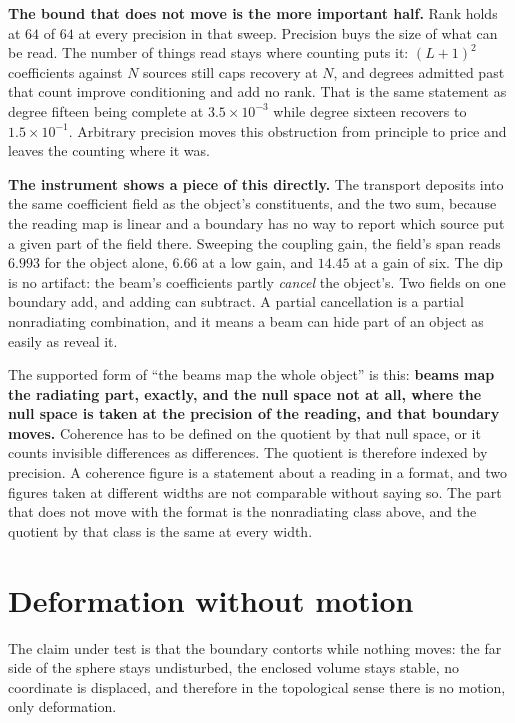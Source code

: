 \textbf{The bound that does not move is the more important half.} Rank holds at \(64\) of \(64\) at every precision in that sweep. Precision buys the size of what can be read. The number of things read stays where counting puts it: \((L+1)^2\) coefficients against \(N\) sources still caps recovery at \(N\), and degrees admitted past that count improve conditioning and add no rank. That is the same statement as degree fifteen being complete at \(3.5 \times 10^{-3}\) while degree sixteen recovers to \(1.5 \times 10^{-1}\). Arbitrary precision moves this obstruction from principle to price and leaves the counting where it was.

\textbf{The instrument shows a piece of this directly.} The transport deposits into the same coefficient field as the object's constituents, and the two sum, because the reading map is linear and a boundary has no way to report which source put a given part of the field there. Sweeping the coupling gain, the field's span reads \(6.993\) for the object alone, \(6.66\) at a low gain, and \(14.45\) at a gain of six. The dip is no artifact: the beam's coefficients partly \emph{cancel} the object's. Two fields on one boundary add, and adding can subtract. A partial cancellation is a partial nonradiating combination, and it means a beam can hide part of an object as easily as reveal it.

The supported form of ``the beams map the whole object'' is this: \textbf{beams map the radiating part, exactly, and the null space not at all, where the null space is taken at the precision of the reading, and that boundary moves.} Coherence has to be defined on the quotient by that null space, or it counts invisible differences as differences. The quotient is therefore indexed by precision. A coherence figure is a statement about a reading in a format, and two figures taken at different widths are not comparable without saying so. The part that does not move with the format is the nonradiating class above, and the quotient by that class is the same at every width.

\section{Deformation without motion}

The claim under test is that the boundary contorts while nothing moves: the far side of the sphere stays undisturbed, the enclosed volume stays stable, no coordinate is displaced, and therefore in the topological sense there is no motion, only deformation.

